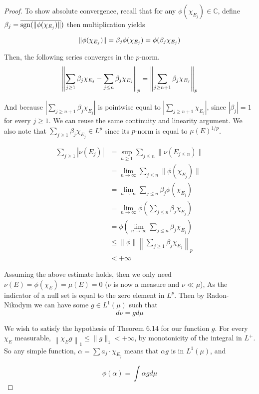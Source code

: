 \documentclass[../../main.tex]{subfiles}
\begin{document}
\begin{proof}
To show absolute convergence, recall that for any $\phi(\chi_{E_j})\in\mathbb{C}$, define $\beta_j = \overline{\operatorname{sgn}(\lVert {\phi(\chi_{E_j})} \rVert})$ then multiplication yields

\[
\lVert {\phi(\chi_{E_j})} \rVert = \beta_j\phi(\chi_{E_j}) = \phi(\beta_j\chi_{E_j})
\]

Then, the following series converges in the $p$-norm.
\[
\left\lVert {\sum_{j\geq 1} \beta_j\chi_{E_j} - \sum_{j\leq n} \beta_j\chi_{E_j}} \right\rVert_p  = \left\lVert {\sum_{j\geq n+1} \beta_j\chi_{E_j}} \right\rVert_p
\]

And because $\left|\sum_{j\geq n+1} \beta_j\chi_{E_j}\right|$ is pointwise equal to $\left|\sum_{j\geq n+1} \chi_{E_j}\right|$, since $|\beta_j|=1$ for every $j\geq 1$. We can reuse the same continuity and linearity argument. We also note that $\sum_{j\geq 1} \beta_j\chi_{E_j}\in L^p$  since its $p$-norm is equal to $\mu(E)^{1/p}$.

\begin{align*}
    \sum_{j\geq 1} \left|\nu(E_j)\right|&=\sup_{n\geq 1} \sum_{j\leq n} \lVert \nu(E_{j\leq n})\rVert\\[1ex]
    &= \lim_{n\to\infty} \sum_{j\leq n} \lVert \phi(\chi_{E_j})\rVert\\[1ex]
    &= \lim_{n\to\infty} \sum_{j\leq n} \beta_j\phi(\chi_{E_j})\\[1ex]
    &= \lim_{n\to\infty} \phi\left(\sum_{j\leq n}\beta_j\chi_{E_j}\right)\\[2ex]
    &= \phi\left(\lim_{n\to\infty} \sum_{j\leq n}\beta_j\chi_{E_j}\right)\\[2ex]
    &\leq \lVert \phi \rVert \left\lVert \sum_{j\geq 1} \beta_j\chi_{E_j}\right\rVert_p\\[1ex]
    &< +\infty
\end{align*}

Assuming the above estimate holds, then we only need $\nu(E) = \phi(\chi_E) = \mu(E) = 0$ ($\nu$ is now a measure and $\nu\ll\mu$), As the indicator of a null set is equal to the zero element in $L^p$. Then by Radon-Nikodym we can have some $g\in L^1(\mu)$ such that 
\[
d\nu = gd\mu
\]

We wish to satisfy the hypothesis of Theorem 6.14 for our function $g$. For every $\chi_E$ measurable, $\left\lVert \chi_E g\right\rVert_1\leq \lVert g\rVert_1<+\infty$, by monotonicity of the integral in $L^+$. So any simple function, $\alpha = \sum a_j\cdot\chi_{E_j}$ means that $\alpha g$ is in $L^1(\mu)$, and

\[
\phi(\alpha) = \int \alpha g d\mu
\]


\end{proof}
\end{document}
